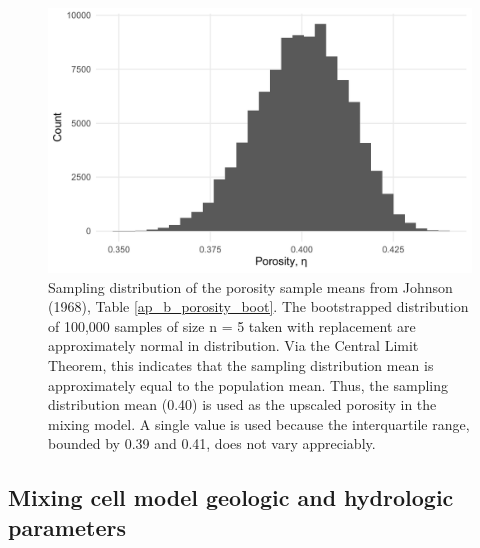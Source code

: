 \clearpage


\bgroup

\begin{figure}[H]
	\includegraphics[width=\textwidth]{ch3_appendix_figs/porosity_boot.pdf}
	\caption{Sampling distribution of the porosity sample means from Johnson (1968), Table \ref{ap_b_porosity_boot}. The bootstrapped distribution of 100,000 samples of size n = 5 taken with replacement are approximately normal in distribution. Via the Central Limit Theorem, this indicates that the sampling distribution mean is approximately equal to the population mean. Thus, the sampling distribution mean (0.40) is used as the upscaled porosity in the mixing model. A single value is used because the interquartile range, bounded by 0.39 and 0.41, does not vary appreciably.}
	\label{ap_b_porosity_boot_hist}
\end{figure}

\egroup



\subsection{Mixing cell model geologic and hydrologic parameters}




\bgroup

